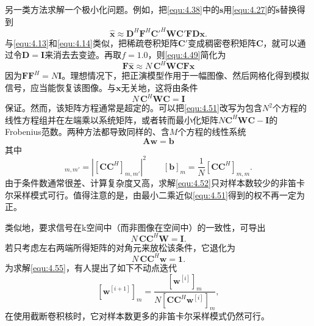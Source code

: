\documentclass[12pt]{article}
\let\originallautoref\autoref
\renewcommand{\autoref}[1]{\allowbreak\originallautoref{#1}}
\begin{document}
另一类方法求解一个极小化问题。例如，把\autoref{equ:4.38}中的$\bm{s}$用\autoref{equ:4.27}的$\tilde{\bm{s}}$替换得到
\begin{equation}
    \hat{\bm{x}}\approx\mathbf{D}^H\mathbf{F}^H\mathbf{C}'^H\mathbf{W}\mathbf{C}'\mathbf{F}\mathbf{D}\bm{x}.
    \label{equ:4.49}
\end{equation}
与\autoref{equ:4.13}和\autoref{equ:4.14}类似，把稀疏卷积矩阵$\mathbf{C}'$变成稠密卷积矩阵$\mathbf{C}$，就可以通过令$\mathbf{D}=\mathbf{I}$来消去去变迹。再取$f=1.0$，则\autoref{equ:4.49}简化为
\begin{equation}
    \mathbf{F}\hat{\bm{x}}\approx N\,\mathbf{C}^H\mathbf{W}\mathbf{C}\mathbf{F}\bm{x}
    \label{equ:4.50}
\end{equation}
因为$\mathbf{F}\mathbf{F}^H=N\mathbf{I}$。理想情况下，把正演模型作用于一幅图像、然后网格化得到模拟信号，应当能恢复该图像。与$\bm{x}$无关地，这将由条件
\begin{equation}
    N\,\mathbf{C}^H\mathbf{W}\mathbf{C}=\mathbf{I}
    \label{equ:4.51}
\end{equation}
保证。然而，该矩阵方程通常是超定的。可以把\autoref{equ:4.51}改写为包含$N^2$个方程的线性方程组并在左端乘以系统矩阵，或者转而最小化矩阵$N\mathbf{C}^H\mathbf{W}\mathbf{C}-\mathbf{I}$的Frobenius范数。两种方法都导致同样的、含$M$个方程的线性系统
\begin{equation}
    \mathbf{A}\bm{w}=\bm{b}
    \label{equ:4.52}
\end{equation}
其中
\begin{equation}
    [\mathbf{A}]_{m,m'}=\left|\left[\mathbf{C}\mathbf{C}^H\right]_{m,m'}\right|^2\qquad [\bm{b}]_m=\frac{1}{N}\left[\mathbf{C}\mathbf{C}^H\right]_{m,m}.
    \label{equ:4.53}
\end{equation}
由于条件数通常很差、计算复杂度又高，求解\autoref{equ:4.52}只对样本数较少的非笛卡尔采样模式可行。值得注意的是，由最小二乘近似\autoref{equ:4.51}得到的权不再一定为正。

类似地，要求信号在k空间中（而非图像在空间中）的一致性，可导出
\begin{equation}
    N\,\mathbf{C}\mathbf{C}^H\mathbf{W}=\mathbf{I}.
    \label{equ:4.54}
\end{equation}
若只考虑左右两端所得矩阵的对角元来放松该条件，它退化为
\begin{equation}
    N\,\mathbf{C}\mathbf{C}^H\bm{w}=\bm{1}.
    \label{equ:4.55}
\end{equation}
为求解\autoref{equ:4.55}，有人提出了如下不动点迭代
\begin{equation}
    \left[\bm{w}^{[i+1]}\right]_m=\frac{\left[\bm{w}^{[i]}\right]_m}{N\left[\mathbf{C}\mathbf{C}^H\bm{w}^{[i]}\right]_m},
    \label{equ:4.56}
\end{equation}
在使用截断卷积核时，它对样本数更多的非笛卡尔采样模式仍然可行。
\end{document}
